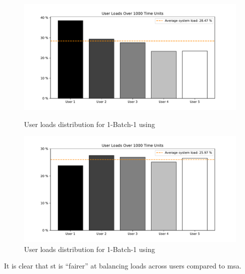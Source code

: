 \begin{figure}[!ht]
	\centering
	\begin{minipage}[b]{0.45\textwidth}
		\includegraphics[width=\textwidth]{img/1_BATCHONE_MSA_NU5_GI3_SIM1000_FAIR}
		\caption{User loads distribution for 1-Batch-1 using }
		\label{fig:msa_fairness}
	\end{minipage}
	\hfill
	\begin{minipage}[b]{0.45\textwidth}
		\includegraphics[width=\textwidth]{img/1_BATCHONE_ST_NU5_GI3_SIM1000_FAIR}
		\caption{User loads distribution for 1-Batch-1 using }
		\label{fig:st_fairness}
	\end{minipage}
\end{figure}

It is clear that \gls{st} is ``fairer'' at balancing loads across users compared to \gls{msa}. 

\subsection{}
\label{subsec:rl_discussion}

